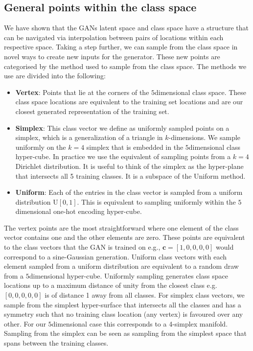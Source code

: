 \documentclass[12pt]{iopart}
\newcommand{\ndimensional}[1]{$#1$\nobreakdash\discretionary{-}{-}{-}dimensional}
\begin{document}
\subsection{General points within the class space}
We have shown that the \acp{GAN} latent space and class space have a structure that can be navigated via interpolation between pairs of locations within each respective space. Taking a step further, we can sample from the class space in novel ways to create new inputs for the generator. These new points are categorised by the method used to sample from the class space. The methods we use are divided into the following: 
%
\begin{itemize}
%
\item {\bf Vertex}: Points that lie at the corners of the \ndimensional{5} class space. These class space locations are equivalent to the training set locations and are our closest generated representation of the training set.
%
\item {\bf Simplex}: This class vector we define as uniformly sampled points on a simplex, which is a generalization of a triangle in $k$-dimensions. We sample uniformly on the $k=4$ simplex that is embedded in the \ndimensional{5} class hyper-cube. In practice we use the equivalent of sampling points from a $k=4$ Dirichlet distribution. It is useful to think of the simplex as the hyper-plane that intersects all 5 training classes. It is a subspace of the Uniform method.  
%
\item {\bf Uniform}: Each of the entries in the class vector is sampled from a uniform distribution $\text{U}[0,1]$. This is equivalent to sampling uniformly within the \ndimensional{5} one-hot encoding hyper-cube.
%
\end{itemize}

The vertex points are the most straightforward where one element of the class vector contains one and the other elements are zero. These points are equivalent to the class vectors that the \ac{GAN} is trained on e.g., $\mathbf{c} = [1,0,0,0,0]$ would correspond to a sine-Gaussian generation. Uniform class vectors with each element sampled from a uniform distribution are equivalent to a random draw from a \ndimensional{5} hyper-cube. Uniformly sampling generates class space locations up to a maximum distance of unity from the closest class e.g. $[0,0,0,0,0]$ is of distance 1 away from all classes. For simplex class vectors, we sample from the simplest hyper-surface that intersects all the classes and has a symmetry such that no training class location (any vertex) is favoured over any other. For our \ndimensional{5} case this corresponds to a 4-simplex manifold. Sampling from the simplex can be seen as sampling from the simplest space that spans between the training classes.   
\end{document}

